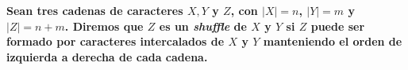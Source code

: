 \textbf{Sean tres cadenas de caracteres $X, Y$ y $Z$, con $|X| = n$, $|Y | = m$ y $|Z| = n + m$. Diremos que $Z$ es un \textit{shuffle} de $X$ y $Y$ si $Z$ puede ser formado por caracteres intercalados de $X$ y $Y$ manteniendo el orden de izquierda a derecha de cada cadena.}\vspace{.2cm}